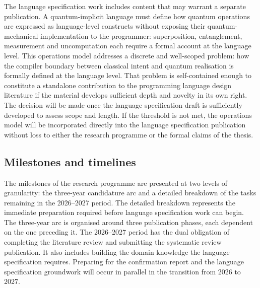 The language specification work includes content that may warrant a separate publication.
A quantum-implicit language must define how quantum operations are expressed as language-level constructs without exposing their quantum-mechanical implementation to the programmer: superposition, entanglement, measurement and uncomputation each require a formal account at the language level.
This operations model addresses a discrete and well-scoped problem: how the compiler boundary between classical intent and quantum realisation is formally defined at the language level.
That problem is self-contained enough to constitute a standalone contribution to the programming language design literature if the material develops sufficient depth and novelty in its own right.
The decision will be made once the language specification draft is sufficiently developed to assess scope and length.
If the threshold is not met, the operations model will be incorporated directly into the language specification publication without loss to either the research programme or the formal claims of the thesis.

\subsection{Milestones and timelines}\label{subsec:pre_confirmation:work_plan:milestones}
The milestones of the research programme are presented at two levels of granularity: the three-year candidature arc and a detailed breakdown of the tasks remaining in the 2026--2027 period.
The detailed breakdown represents the immediate preparation required before language specification work can begin.
The three-year arc is organised around three publication phases, each dependent on the one preceding it.
The 2026--2027 period has the dual obligation of completing the literature review and submitting the systematic review publication.
It also includes building the domain knowledge the language specification requires.
Preparing for the confirmation report and the language specification groundwork will occur in parallel in the transition from 2026 to 2027.

